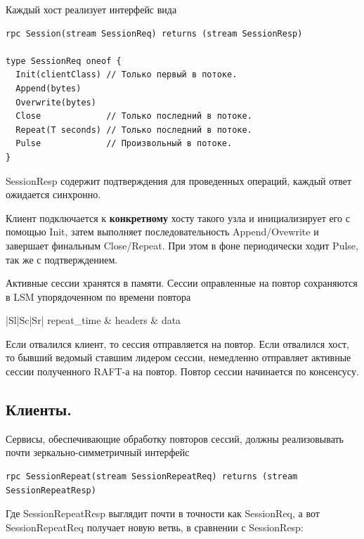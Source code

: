 \documentclass[a4paper,12pt]{article}
\begin{document}
    Каждый хост реализует интерфейс вида

    \begin{lstlisting}
rpc Session(stream SessionReq) returns (stream SessionResp)

type SessionReq oneof {
  Init(clientClass) // Только первый в потоке.
  Append(bytes)
  Overwrite(bytes)
  Close             // Только последний в потоке.
  Repeat(T seconds) // Только последний в потоке.
  Pulse             // Произвольный в потоке.
}
    \end{lstlisting}

    SessionResp содержит подтверждения для проведенных операций, каждый ответ ожидается синхронно.

    Клиент подключается к \textbf{конкретному} хосту такого узла и инициализирует его с помощью Init, затем выполняет последовательность Append/Ovewrite
    и завершает финальным Close/Repeat. При этом в фоне периодически ходит Pulse, так же с подтверждением.

    Активные сессии хранятся в памяти. Сессии оправленные на повтор сохраняются в LSM упорядоченном по времени повтора

    \begin{center}
        \begin{tabular}{|Sl|Sc|Sr|}
            \hline
            repeat\_time & headers & data \\
            \hline
        \end{tabular}
    \end{center}

    Если отвалился клиент, то сессия отправляется на повтор. Если отвалился хост, то бывший ведомый ставшим лидером сессии, немедленно
    отправляет активные сессии полученного RAFT-а на повтор. Повтор сессии начинается по консенсусу.

    \subsection{Клиенты.}

    Сервисы, обеспечивающие обработку повторов сессий, должны реализовывать почти зеркально-симметричный интерфейс

    \begin{lstlisting}
rpc SessionRepeat(stream SessionRepeatReq) returns (stream SessionRepeatResp)
    \end{lstlisting}

    Где SessionRepeatResp выглядит почти в точности как SessionReq, а вот SessionRepeatReq получает новую ветвь, в сравнении с SessionResp:
\end{document}

